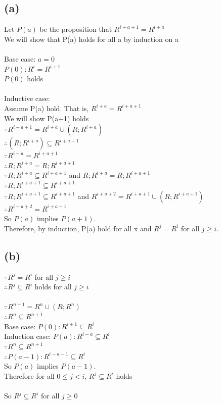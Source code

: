 \documentclass{article} %
\begin{document}
\subsection*{(a)}
Let $P(a)$ be the proposition that $R^{i+a+1}=R^{i+a}$\\
We will show that P(a) holds for all a by induction on a\\
\\
Base case: $a=0$\\
$P(0):R^i=R^{i+1}$\\
$P(0)$ holds\\
\\
Inductive case:\\
Assume P(a) hold. That is, $R^{i+a}=R^{i+a+1}$\\
We will show P(a+1) holds\\
$\because R^{i+a+1} = R^{i+a} \cup (R;R^{i+a})$\\
$\therefore(R;R^{i+a}) \subseteq R^{i+a+1}$\\
$\because R^{i+a} = R^{i+a+1}$\\
$\therefore R;R^{i+a} = R;R^{i+a+1}$\\
$\because R;R^{i+a}\subseteq R^{i+a+1}$ and $R;R^{i+a} = R;R^{i+a+1}$\\
$\therefore R;R^{i+a+1} \subseteq R^{i+a+1}$\\
$\because R;R^{i+a+1} \subseteq R^{i+a+1}$ and $R^{i+a+2} = R^{i+a+1} \cup (R;R^{i+a+1})$\\
$\therefore R^{i+a+2} = R^{i+a+1}$\\
So $P(a)$ implies $P(a+1)$.\\
Therefore, by induction, P(a) hold for all x and $R^j = R^i$ for all $j \geqslant i$.\\

\subsection*{(b)}
$\because R^j = R^i$ for all $j \geqslant i$\\
$\therefore R^j \subseteq R^i$ holds for all $j \geqslant i$\\
\\
$\because R^{n+1} = R^{n} \cup (R;R^{n})$\\
$\therefore R^n \subseteq R^{n + 1}$\\
Base case: $P(0): R^{i+1} \subseteq R^i$\\
Induction case: $P(a): R^{i-a} \subseteq R^i$\\
$\because R^n \subseteq R^{n + 1}$\\
$\therefore P(a-1): R^{i-a-1} \subseteq R^i$\\
So $P(a)$ implies $P(a-1)$.\\
Therefore for all $0\leqslant j<i$,  $R^j \subseteq R^i$ holds\\
\\
So  $R^j \subseteq R^i$ for all $j\geqslant 0$
\end{document}
